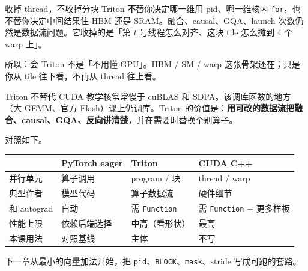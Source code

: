 \begin{definition}{收掉 thread，不收掉分块}
Triton \textbf{不}替你决定哪一维用 pid、哪一维核内 \texttt{for}，也不替你决定中间结果住 HBM 还是 SRAM。融合、causal、GQA、launch 次数仍然是数据流问题。它收掉的是「第 $t$ 号线程怎么对齐、这块 tile 怎么摊到 4 个 warp 上」。
\end{definition}

所以：会 Triton 不是「不用懂 GPU」。HBM / SM / warp 这张骨架还在；只是你从 tile 往下看，不再从 thread 往上看。

\begin{definition}{Triton 不替代 CUDA}
教学核常常慢于 cuBLAS 和 SDPA。该调库函数的地方（大 GEMM、官方 Flash）课上仍调库。Triton 的价值是：\textbf{用可改的数据流把融合、causal、GQA、反向讲清楚}，并在需要时替换个别算子。
\end{definition}

对照如下。

\noindent\begin{minipage}{\linewidth}
\centering
{}
\begin{tabular}{llll}
  \toprule
  & PyTorch eager & Triton & CUDA C++ \\
  \midrule
  并行单元 & 算子调用 & program / 块 & thread / warp \\
  典型作者 & 模型代码 & 算子数据流 & 硬件细节 \\
  和 autograd & 自动 & 需 \texttt{Function} & 需 \texttt{Function} + 更多样板 \\
  性能上限 & 依赖后端选择 & 中高（看形状） & 最高 \\
  本课用法 & 对照基线 & 主体 & 不写 \\
  \bottomrule
\end{tabular}
\end{minipage}

下一章从最小的向量加法开始，把 \texttt{pid}、\texttt{BLOCK}、\texttt{mask}、stride 写成可跑的套路。
